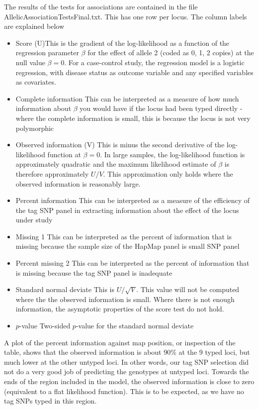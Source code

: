 \documentclass[preprint, a4paper]{aastex}
\begin{document}
The results of the tests for associations are contained in the file
AllelicAssociationTestsFinal.txt.  This has one row per locus.  The
column labels are explained below
\begin{itemize}
\item{Score (U)}This is the gradient of the log-likelihood as a
  function of the regression parameter $\beta$ for the effect of
  allele 2 (coded as 0, 1, 2 copies) at the null value $\beta=0$.  For
  a case-control study, the regression model is a logistic regression,
  with disease status as outcome variable and any specified variables
  as covariates.
\item{Complete information } This can be interpreted as a measure of
  how much information about $\beta$ you would have if the locus had
  been typed directly - where the complete information is small, this
  is because the locus is not very polymorphic
\item{Observed information (V)} This is minus the second derivative of
  the log-likelihood function at $\beta = 0$.  In large samples, the
  log-likelihood function is approximately quadratic and the maximum
  likelihood estimate of $\beta$ is therefore approximately $U/V$.
  This approximation only holds where the observed information is
  reasonably large.
\item{Percent information } This can be interpreted as a measure of
  the efficiency of the tag SNP panel in extracting information about
  the effect of the locus under study
\item{Missing 1} This can be interpreted as the percent of information
  that is missing because the sample size of the HapMap panel is small
  SNP panel
\item{Percent missing 2} This can be interpreted as the percent of
  information that is missing because the tag SNP panel is inadequate
\item{Standard normal deviate} This is $U / \sqrt{V}$.  This value
  will not be computed where the the observed information is small.
  Where there is not enough information, the asymptotic properties of
  the score test do not hold.
\item{$p$-value } Two-sided $p$-value for the standard normal deviate
\end{itemize}

A plot of the percent information against map position, or inspection
of the table, shows that the observed information is about 90\% at the
9 typed loci, but much lower at the other untyped loci.  In other
words, our tag SNP selection did not do a very good job of predicting
the genotypes at untyped loci.  Towards the ends of the region
included in the model, the observed information is close to zero
(equivalent to a flat likelihood function).  This is to be expected,
as we have no tag SNPs typed in this region.
\end{document}
